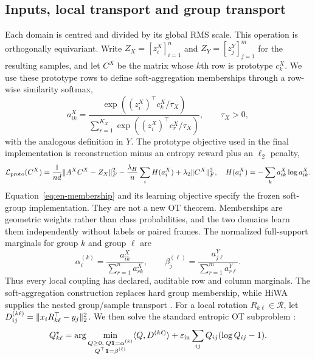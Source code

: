 \documentclass[10pt,a4paper]{article}
\begin{document}
\subsection{Inputs, local transport and group transport}
Each domain is centred and divided by its global RMS scale. This operation is orthogonally equivariant. Write $Z_X=[z_i^X]_{i=1}^n$ and $Z_Y=[z_j^Y]_{j=1}^m$ for the resulting samples, and let $C^X$ be the matrix whose $k$th row is prototype $c_k^X$. We use these prototype rows to define soft-aggregation memberships through a row-wise similarity softmax,
\begin{equation}
a_{ik}^X=\frac{\exp((z_i^X)^\top c_k^X/\tau_X)}{\sum_{r=1}^{K_X}\exp((z_i^X)^\top c_r^X/\tau_X)},
\qquad \tau_X>0,
\label{eq:en-membership}
\end{equation}
with the analogous definition in $Y$. The prototype objective used in the final implementation is reconstruction minus an entropy reward plus an $\ell_2$ penalty,
\begin{equation}
\mathcal L_{\rm proto}(C^X)=\frac{1}{nd}\lVert A^XC^X-Z_X\rVert_F^2-
\frac{\lambda_H}{n}\sum_i H(a_i^X)+\lambda_2\lVert C^X\rVert_F^2,
\quad H(a_i^X)=-\sum_k a_{ik}^X\log a_{ik}^X .
\label{eq:en-prototype}
\end{equation}
Equation~\ref{eq:en-membership} and its learning objective specify the frozen soft-group implementation. They are not a new OT theorem. Memberships are geometric weights rather than class probabilities, and the two domains learn them independently without labels or paired frames. The normalized full-support marginals for group $k$ and group $\ell$ are
\begin{equation}
\alpha_i^{(k)}=\frac{a_{ik}^X}{\sum_{r=1}^n a_{rk}^X},\qquad
\beta_j^{(\ell)}=\frac{a_{j\ell}^Y}{\sum_{r=1}^m a_{r\ell}^Y}.
\label{eq:en-marginals}
\end{equation}
Thus every local coupling has declared, auditable row and column marginals. The soft-aggregation construction replaces hard group membership, while HiWA supplies the nested group/sample transport \cite{lee2019hierarchical}. For a local rotation $R_{k\ell}\in\mathcal R$, let $D_{ij}^{(k\ell)}=\lVert x_iR_{k\ell}^\top-y_j\rVert_2^2$. We then solve the standard entropic OT subproblem \cite{cuturi2013sinkhorn,peyre2019computational}:
\begin{equation}
Q_{k\ell}^\star=\arg\min_{\substack{Q\ge0,\;Q\mathbf1=\alpha^{(k)}\\Q^\top\mathbf1=\beta^{(\ell)}}}
\langle Q,D^{(k\ell)}\rangle+\varepsilon_{\rm in}\sum_{ij}Q_{ij}(\log Q_{ij}-1).
\label{eq:en-inner}
\end{equation}
\end{document}
